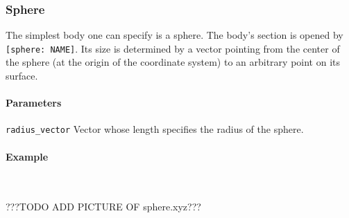 \subsubsection{Sphere}
The simplest body one can specify is a sphere. The body's section is opened by \lstinline{[sphere: NAME]}. Its size is determined by a  vector pointing from the center of the sphere (at the origin of the coordinate system) to an arbitrary point on its surface.

\paragraph{Parameters}
\begin{description}
 \item{\lstinline{radius_vector}} Vector whose length specifies the radius of the sphere.
\end{description}

\paragraph{Example}\ 


???TODO ADD PICTURE OF sphere.xyz???